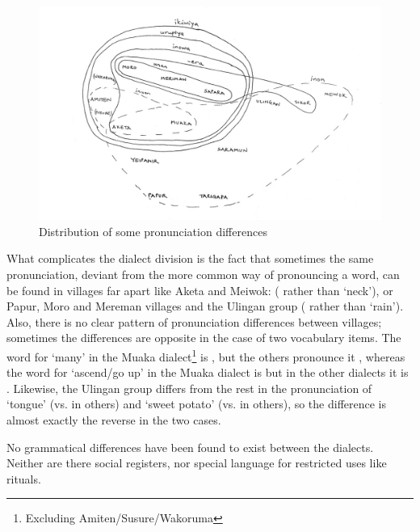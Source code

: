 
\begin{figure}
\caption{Distribution of some pronunciation differences}
\label{map:1:prondistribution}
\includegraphics[width=\textwidth]{figures/1-distribution_of_some_pronounciation_differnces_map.jpeg}
\end{figure}

What complicates the dialect division is the fact that sometimes the same pronunciation, deviant from the more common way of pronouncing a word, can be found in villages far apart like Aketa and Meiwok: ( rather than  `neck'), or Papur,  Moro and Mereman villages and the Ulingan group ( rather than  `rain'). Also, there is no clear pattern of pronunciation differences between villages; sometimes the differences are opposite in the case of two vocabulary items. The word for `many' in the Muaka dialect\footnote{Excluding Amiten/Susure/Wakoruma} is , but the others pronounce it , whereas the word for `ascend/go up' in the Muaka dialect is \emphs but in the other dialects it is . Likewise, the Ulingan group differs from the rest in the pronunciation of  `tongue' (vs.  in others) and  `sweet potato' (vs.  in others), so the difference is almost exactly the reverse in the two cases.  

No grammatical differences have been found to exist between the dialects.  Neither are there social registers, nor special language for restricted uses like rituals. 

